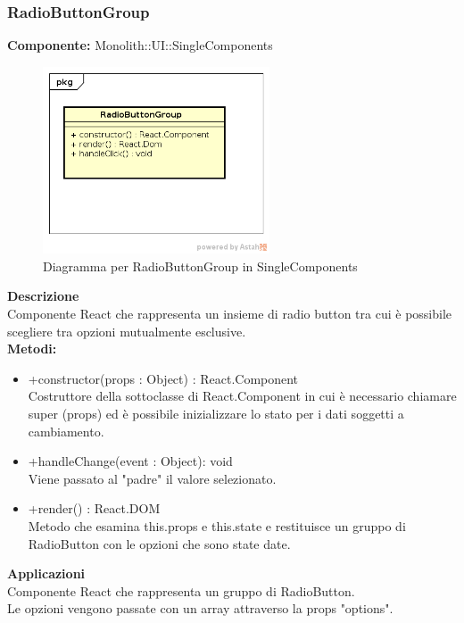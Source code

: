 \clearpage

\subsubsection{RadioButtonGroup}
\textbf{Componente:}  Monolith::UI::SingleComponents\\
   \FloatBarrier
   \begin{figure}[ht]
   \centering
   \includegraphics[width=0.6\textwidth]{img/single-RadioButtonGroup.png}
   \caption{{Diagramma per RadioButtonGroup in SingleComponents}}
\end{figure}
\FloatBarrier
\textbf{Descrizione}\\
Componente React che rappresenta un insieme di radio button tra cui è possibile scegliere tra opzioni mutualmente esclusive.\\

\textbf{Metodi:} 
\begin{itemize}
\item +constructor(props : Object) : React.Component 
\\
Costruttore della sottoclasse di React.Component in cui è necessario chiamare super (props) ed è possibile inizializzare lo stato per i dati soggetti a cambiamento.

\item +handleChange(event : Object): void 
\\
Viene passato al "padre" il valore selezionato.

\item +render() : React.DOM 
\\
Metodo che esamina this.props e this.state e restituisce un gruppo di RadioButton con le opzioni che sono state date.

\end{itemize} 


\textbf{Applicazioni}\\
Componente React che rappresenta un gruppo di RadioButton. \\ Le opzioni vengono passate con un array attraverso la props "options". 


